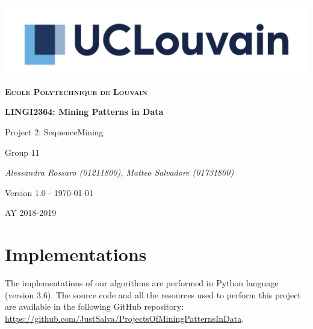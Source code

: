 \documentclass[10pt, a4paper]{article}
\begin{document}
	\begin{titlepage}
		\centering
		\includegraphics[scale =0.8]{logo.jpg}\par\vspace{1cm}
		{\scshape\LARGE\bfseries Ecole Polytechnique de Louvain\par}
		\vspace{1.5cm}
		{\scshape\Large \par}
		\vspace{1.5cm}
		{\huge\bfseries LINGI2364: Mining Patterns in Data \par}
		\vspace{1cm}
		{\Huge Project 2: SequenceMining \par}
		\vspace{2cm}
		{\LARGE Group 11\par}
		\vspace{1cm}
		{\Large\itshape Alessandra Rossaro (01211800), Matteo Salvadore (01731800)\par}
		\vspace{2cm}
		{\small Version 1.0 - \today\par}

		\vfill

		{\large AY 2018-2019\par}
	\end{titlepage}

	\section{Implementations}
		The implementations of our algorithms are performed in Python language (version 3.6).
		The source code and all the resources used to perform this project are available in the following GitHub repository: \url{https://github.com/JustSalva/ProjectsOfMiningPatternsInData}.\newline
	
\end{document}
